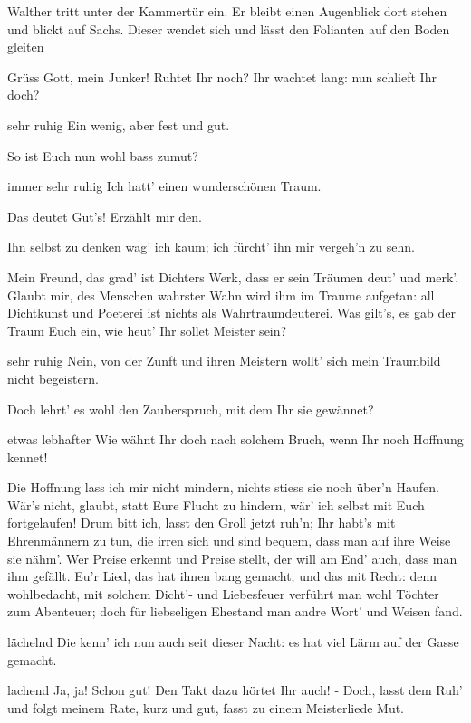 \begin{drama}
\scene

Walther tritt unter der Kammertür ein. Er bleibt einen Augenblick dort stehen und blickt auf Sachs. Dieser wendet sich und lässt den Folianten auf den Boden gleiten

\Sachsspeaks
Grüss Gott, mein Junker! Ruhtet Ihr noch?
Ihr wachtet lang: nun schlieft Ihr doch?

\Waltherspeaks
sehr ruhig
Ein wenig, aber fest und gut.

\Sachsspeaks
So ist Euch nun wohl bass zumut?

\Waltherspeaks
immer sehr ruhig
Ich hatt' einen wunderschönen Traum.

\Sachsspeaks
Das deutet Gut's! Erzählt mir den.

\Waltherspeaks
Ihn selbst zu denken wag' ich kaum;
ich fürcht' ihn mir vergeh'n zu sehn.

\Sachsspeaks
Mein Freund, das grad' ist Dichters Werk,
dass er sein Träumen deut' und merk'.
Glaubt mir, des Menschen wahrster Wahn
wird ihm im Traume aufgetan:
all Dichtkunst und Poeterei
ist nichts als Wahrtraumdeuterei.
Was gilt's, es gab der Traum Euch ein,
wie heut' Ihr sollet Meister sein?

\Waltherspeaks
sehr ruhig
Nein, von der Zunft und ihren Meistern
wollt' sich mein Traumbild nicht begeistern.

\Sachsspeaks
Doch lehrt' es wohl den Zauberspruch,
mit dem Ihr sie gewännet?

\Waltherspeaks
etwas lebhafter
Wie wähnt Ihr doch nach solchem Bruch,
wenn Ihr noch Hoffnung kennet!

\Sachsspeaks
Die Hoffnung lass ich mir nicht mindern,
nichts stiess sie noch über'n Haufen.
Wär's nicht, glaubt, statt Eure Flucht zu hindern,
wär' ich selbst mit Euch fortgelaufen!
Drum bitt ich, lasst den Groll jetzt ruh'n;
Ihr habt's mit Ehrenmännern zu tun,
die irren sich und sind bequem,
dass man auf ihre Weise sie nähm'.
Wer Preise erkennt und Preise stellt,
der will am End' auch, dass man ihm gefällt.
Eu'r Lied, das hat ihnen bang gemacht;
und das mit Recht:
denn wohlbedacht,
mit solchem Dicht'- und Liebesfeuer
verführt man wohl Töchter zum Abenteuer;
doch für liebseligen Ehestand
man andre Wort' und Weisen fand.

\Waltherspeaks
lächelnd
Die kenn' ich nun auch seit dieser Nacht:
es hat viel Lärm auf der Gasse gemacht.

\Sachsspeaks
lachend
Ja, ja! Schon gut! Den Takt dazu
hörtet Ihr auch! - Doch, lasst dem Ruh'
und folgt meinem Rate, kurz und gut,
fasst zu einem Meisterliede Mut.


\end{drama}

